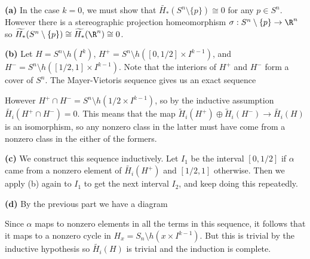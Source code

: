 \documentclass[11pt,letterpaper]{article}
\begin{document}
\begin{solution}
    \textbf{(a)} In the case $k=0$, we must show that $\widetilde{H_*}(S^n\setminus \{p\})\cong 0$ for any $p\in S^n$. However there is a stereographic projection homeomorphism $\sigma : S^n\setminus \{p\} \to \R^n$ so $\widetilde{H_*}(S^n\setminus \{p\})\cong \widetilde{H_*}(\R^n)\cong 0$.

    \textbf{(b)} Let $H=S^n\setminus h(I^k)$, $H^+=S^n\setminus h([0,1 /2]\times I^{k-1})$, and $H^-=S^n\setminus h([1 /2,1]\times I^{k-1})$.
    Note that the interiors of $H^+$ and $H^-$ form a cover of $S^n$. The Mayer-Vietoris sequence gives us an exact sequence
    \begin{center}
    \end{center}
    \quad However $H^+\cap H^- = S^n\setminus h(1 /2\times I^{k-1})$, so by the inductive assumption $\widetilde{H_i}(H^+\cap H^-) = 0$. This means that the map $\widetilde{H}_i(H^+)\oplus \widetilde{H}_i(H^-) \to \widetilde{H_i}(H)$ is an isomorphism, so any nonzero class in the latter must have come from a nonzero class in the either of the formers.

    \textbf{(c)} We construct this sequence inductively. Let $I_1$ be the interval $[0,1 /2]$ if $\alpha$ came from a nonzero element of $\widetilde{H_i}(H^+)$ and $[1/2, 1]$ otherwise. Then we apply (b) again to $I_1$ to get the next interval $I_2$, and keep doing this repeatedly.

    \textbf{(d)} By the previous part we have a diagram 
    \begin{center}
    \end{center}
    Since $\alpha$ maps to nonzero elements in all the terms in this sequence, it follows that it maps to a nonzero cycle in $H_x=S_n\setminus h(x\times I^{k-1})$. But this is trivial by the inductive hypothesis so $\widetilde{H_i}(H)$ is trivial and the induction is complete.
    

\end{solution}
\end{document}
